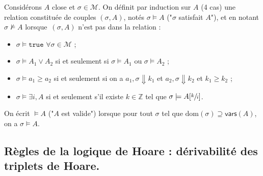 \documentclass[../main]{subfiles}
\begin{document}
  \begin{defn}
    Considérons $A$ close et $\sigma \in \mathcal{M}$.
    On définit par induction sur $A$ (4 cas) une relation constituée de couples $(\sigma, A)$, notés  $\sigma \models A$ ("$\sigma$ satisfait $A$"), et en notant $\sigma \not\models A$ lorsque~$(\sigma, A)$ n'est pas dans la relation :
    \begin{itemize}
      \item $\sigma \models \mathtt{true}$ $\forall \sigma \in \mathcal{M}$ ;
      \item $\sigma \models A_1 \lor A_2$ si et seulement si $\sigma \models A_1$ ou $\sigma \models A_2$ ;
      \item $\sigma \models a_1 \ge a_2$ si et seulement si on a $a_1, \sigma \Downarrow k_1$ et $a_2, \sigma \Downarrow k_2$ et $k_1 \ge k_2$ ;
      \item $\sigma \models \exists i, A$ si et seulement s'il existe $k \in \mathds{Z}$ tel que $\sigma \models A[\sfrac{k}{i}]$.
    \end{itemize}

    On écrit $\models A$ ("$A$ est valide") lorsque pour tout $\sigma$ tel que $\mathrm{dom}(\sigma) \supseteq \mathsf{vars}(A)$, on a $\sigma \models A$.
  \end{defn}

  \subsection{Règles de la logique de Hoare : dérivabilité des triplets de Hoare.}
\end{document}
